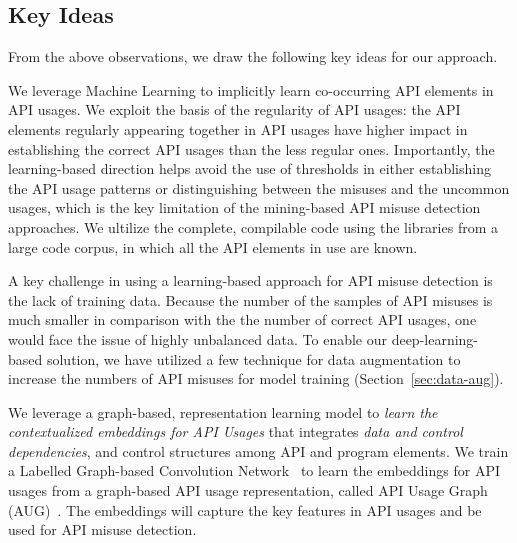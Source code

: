 \subsection{Key Ideas}
\label{sec:key-ideas}

From the above observations, we draw the following key ideas for our
approach.

\begin{key-idea}
We leverage Machine Learning to implicitly learn co-occurring API
elements in API usages. We exploit the basis of the regularity of API
usages: the API elements regularly appearing together in API usages
have higher impact in establishing the correct API usages than the
less regular ones. Importantly, the learning-based direction helps
avoid the use of thresholds in either establishing the API usage
patterns or distinguishing between the misuses and the uncommon
usages, which is the key limitation of the mining-based API misuse
detection approaches. We ultilize the complete, compilable code
using the libraries from a large code corpus, in which all the API
elements in use are known.
\end{key-idea}


\begin{key-idea}
A key challenge in using a learning-based approach for API misuse
detection is the lack of training data. Because the number of the
samples of API misuses is much smaller in comparison with the the
number of correct API usages, one would face the issue of highly
unbalanced data. To enable our deep-learning-based solution, we have
utilized a few technique for data augmentation to increase the numbers
of API misuses for model training
(Section~\ref{sec:data-aug}).
\end{key-idea}

\begin{key-idea} We leverage a graph-based, representation
  learning model to {\em learn the contextualized embeddings for API
    Usages} that integrates {\em data and control dependencies}, and
  control structures among API and program elements. We train a
  Labelled Graph-based Convolution Network~\cite{label-gcn} to learn
  the embeddings for API usages from a graph-based API usage
  representation, called API Usage Graph (AUG)~\cite{msr19}. The
  embeddings will capture the key features in API usages and be used
  for API misuse detection.
\end{key-idea}
